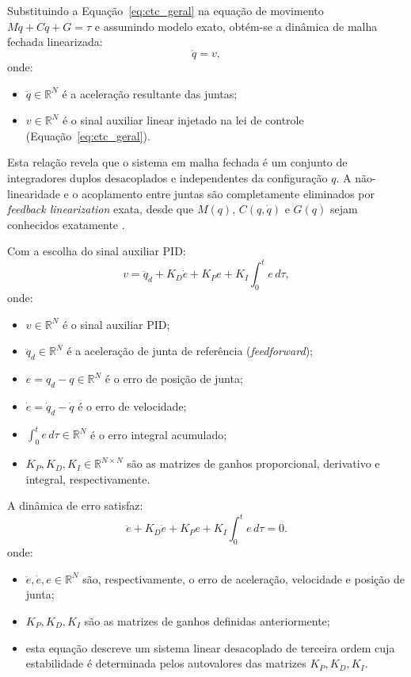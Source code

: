 Substituindo a Equação~\eqref{eq:ctc_geral} na equação de movimento $M\ddot{q} + C\dot{q} + G = \tau$ e assumindo modelo exato, obtém-se a dinâmica de malha fechada linearizada:
\begin{equation}
    \ddot{q} = v,
    \label{eq:ctc_linear}
\end{equation}
onde:
\begin{itemize}
    \item $\ddot{q} \in \mathbb{R}^N$ é a aceleração resultante das juntas;
    \item $v \in \mathbb{R}^N$ é o sinal auxiliar linear injetado na lei de controle (Equação~\eqref{eq:ctc_geral}).
\end{itemize}
Esta relação revela que o sistema em malha fechada é um conjunto de integradores duplos desacoplados e independentes da configuração $q$. A não-linearidade e o acoplamento entre juntas são completamente eliminados por \textit{feedback linearization} exata, desde que $M(q)$, $C(q,\dot{q})$ e $G(q)$ sejam conhecidos exatamente \cite{spong2020robot, isidori1985nonlinear}.

Com a escolha do sinal auxiliar PID:
\begin{equation}
    v = \ddot{q}_d + K_D\dot{e} + K_P e + K_I \int_0^t e\,d\tau,
    \label{eq:v_pid}
\end{equation}
onde:
\begin{itemize}
    \item $v \in \mathbb{R}^N$ é o sinal auxiliar PID;
    \item $\ddot{q}_d \in \mathbb{R}^N$ é a aceleração de junta de referência (\textit{feedforward});
    \item $e = q_d - q \in \mathbb{R}^N$ é o erro de posição de junta;
    \item $\dot{e} = \dot{q}_d - \dot{q}$ é o erro de velocidade;
    \item $\int_0^t e\,d\tau \in \mathbb{R}^N$ é o erro integral acumulado;
    \item $K_P, K_D, K_I \in \mathbb{R}^{N \times N}$ são as matrizes de ganhos proporcional, derivativo e integral, respectivamente.
\end{itemize}

A dinâmica de erro satisfaz:
\begin{equation}
    \ddot{e} + K_D\dot{e} + K_P e + K_I \int_0^t e\,d\tau = 0.
    \label{eq:error_dyn_pid}
\end{equation}
onde:
\begin{itemize}
    \item $\ddot{e}, \dot{e}, e \in \mathbb{R}^N$ são, respectivamente, o erro de aceleração, velocidade e posição de junta;
    \item $K_P, K_D, K_I$ são as matrizes de ganhos definidas anteriormente;
    \item esta equação descreve um sistema linear desacoplado de terceira ordem cuja estabilidade é determinada pelos autovalores das matrizes $K_P, K_D, K_I$.
\end{itemize}

